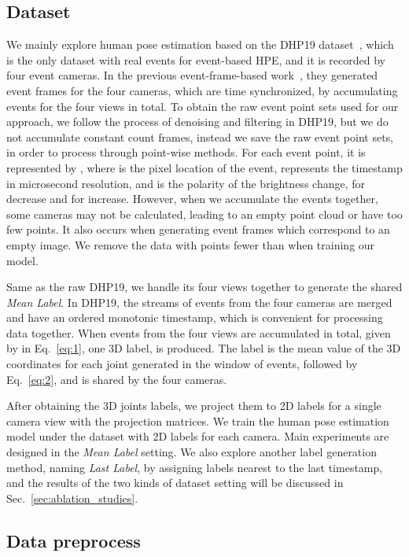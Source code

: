 \documentclass[10pt,twocolumn,letterpaper]{article}
\begin{document}
\subsection{Dataset}
\label{sec:approach_dataset}
We mainly explore human pose estimation based on the DHP19 dataset~\cite{calabrese2019dhp19}, which is the only dataset with real events for event-based HPE, and it is recorded by four event cameras.
In the previous event-frame-based work~\cite{calabrese2019dhp19}, they generated event frames for the four cameras, which are time synchronized, by accumulating  events for the four views in total.
To obtain the raw event point sets used for our approach, we follow the process of denoising and filtering in DHP19, but we do not accumulate constant count frames, instead we save the raw event point sets, in order to process through point-wise methods. For each event point, it is represented by , where  is the pixel location of the event,  represents the timestamp in microsecond resolution, and  is the polarity of the brightness change,  for decrease and  for increase. However, when we accumulate the events together, some cameras may not be calculated, leading to an empty point cloud or have too few points.
It also occurs when generating event frames which correspond to an empty image.
We remove the data with points fewer than  when training our model.

Same as the raw DHP19, we handle its four views together to generate the shared \emph{Mean Label}.
In DHP19, the streams of events from the four cameras are merged and have an ordered monotonic timestamp, which is convenient for processing data together.
When  events from the four views are accumulated in total, given by  in Eq.~\ref{eq:1}, one 3D label,  is produced.
The label is the mean value of the 3D coordinates for each joint generated in the window of  events, followed by Eq.~\ref{eq:2}, and is shared by the four cameras.




After obtaining the 3D joints labels, we project them to 2D labels for a single camera view with the projection matrices.
We train the human pose estimation model under the dataset with 2D labels for each camera. Main experiments are designed in the \emph{Mean Label} setting. We also explore another label generation method, naming \emph{Last Label}, by assigning labels nearest to the last timestamp, and the results of the two kinds of dataset setting will be discussed in Sec.~\ref{sec:ablation_studies}. 

\subsection{Data preprocess}
\end{document}
